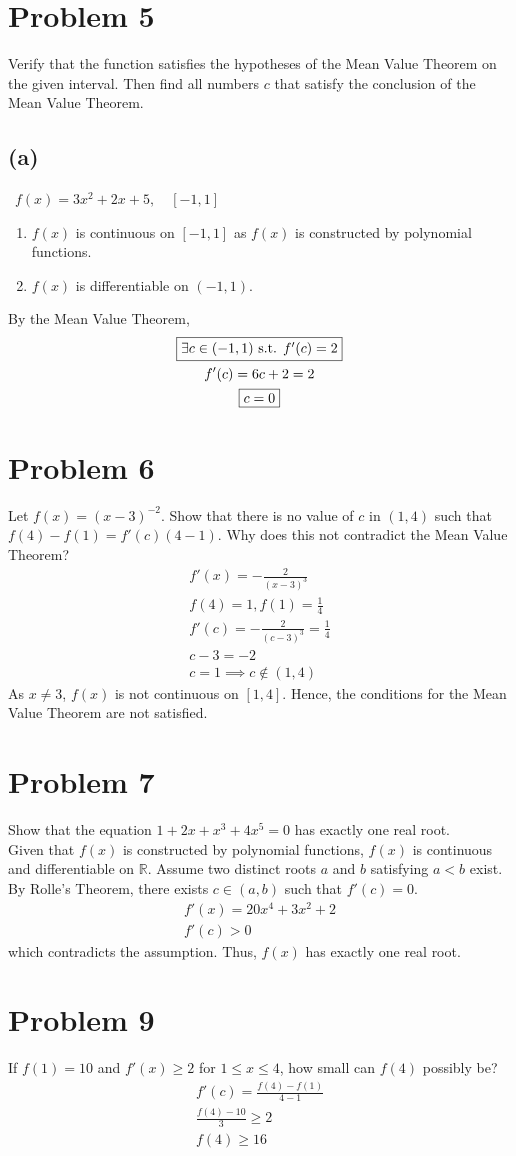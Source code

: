 \documentclass[12pt]{article}
\newcommand{\vem}{\vspace{0.5em}}
\newcommand{\problem}[1]{\section{Problem #1}}
\newcommand{\subproblem}[1]{\subsection{(#1)} \,}
\begin{document}
\problem{5}
Verify that the function satisfies the hypotheses of the Mean Value Theorem on the given interval. Then find all numbers $c$ that satisfy the conclusion of the Mean Value Theorem. \vem

\subproblem{a}
$f(x)=3x^2+2x+5,\quad [-1,1]$
\begin{enumerate}
    \item $f(x)$ is continuous on $[-1,1]$ as $f(x)$ is constructed by polynomial functions.
    \item $f(x)$ is differentiable on $(-1,1)$.
\end{enumerate}
By the Mean Value Theorem,
\begin{gather*}
    \boxed{\exists c \in (-1,1) $ s.t. $ f'(c)=2}\\
    f'(c)=6c+2=2\\
    \boxed{c=0}
\end{gather*}

\problem{6}
Let $f(x)=(x-3)^{-2}.$ Show that there is no value of $c$ in $(1,4)$ such that $f(4)-f(1)=f'(c)(4-1)$. Why does this not contradict the Mean Value Theorem?
\begin{gather*}
    f'(x)=-\frac{2}{(x-3)^3}\\
    f(4)=1, f(1)=\frac{1}{4}\\
    f'(c)=-\frac{2}{(c-3)^3}=\frac{1}{4}\\
    c-3=-2\\
    c=1 \implies c \notin (1,4)
\end{gather*}
As $x\ne 3$, $f(x)$ is not continuous on $[1,4]$. Hence, the conditions for the Mean Value Theorem are not satisfied. \vem 

\problem{7}
Show that the equation $1+2x+x^3+4x^5=0$ has exactly one real root. \vem \\
Given that $f(x)$ is constructed by polynomial functions, $f(x)$ is continuous and differentiable on $\mathbb{R}$.
Assume two distinct roots $a$ and $b$ satisfying $a<b$ exist. By Rolle's Theorem, there exists $c\in (a,b)$ such that $f'(c)=0$.
\begin{gather*}
    f'(x)=20x^4+3x^2+2\\
    f'(c)>0
\end{gather*}
which contradicts the assumption. Thus, $f(x)$ has exactly one real root. \vem 

\problem{9}
If $f(1)=10$ and $f'(x) \ge 2$ for $1 \le x \le 4$, how small can $f(4)$ possibly be?
\begin{gather*}
    f'(c)=\frac{f(4)-f(1)}{4-1}\\
    \frac{f(4)-10}{3}\ge 2\\
    \boxed{f(4)\ge 16}
\end{gather*}
\end{document}
